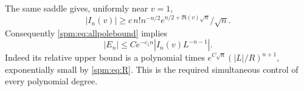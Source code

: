 The same saddle gives, uniformly near $v=1$,
\[
 |I_n(v)|\geq c\,n!n^{-n/2}e^{n/2+\Re(v)\sqrt n}/\sqrt n.
\]
Consequently \eqref{spm:eq:allpolebound} implies
\begin{equation}\label{spm:eq:poleerror}
 |E_n|\leq C e^{-c_1 n}|I_n(v)L^{-n-1}|.
\end{equation}
Indeed its relative upper bound is a polynomial times
$e^{C\sqrt n}(|L|/R)^{n+1}$, exponentially small by \eqref{spm:eq:R}. This is the required simultaneous control of every polynomial degree.
